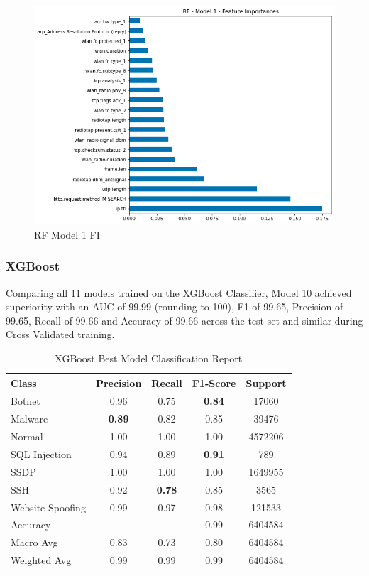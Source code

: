 \begin{figure}[H]
    \centering
	\includegraphics[width=\textwidth]{Appendices/Images/RF/Model1/RF_Model1_FI.png}
	\caption{RF Model 1 FI}
  	\label{fig:rf_model1_fi}
\end{figure}


\subsubsection*{XGBoost}

Comparing all 11 models trained on the XGBoost Classifier, Model 10 achieved superiority with an AUC of 99.99 (rounding to 100), F1 of 99.65, Precision of 99.65, Recall of 99.66 and Accuracy of 99.66 across the test set and similar during Cross Validated training.  


\begin{table}[htbp]
  \centering
  \caption{XGBoost Best Model Classification Report}
  \label{tab:xgb_class_report}
    \begin{tabular}{lcccc}
    \toprule
    Class & Precision & Recall & F1-Score & Support \\
    \midrule
    Botnet & 0.96 & 0.75 & {\color{red}\bfseries 0.84} & 17060 \\
    Malware & {\color{red}\bfseries 0.89} & 0.82 & 0.85 & 39476 \\
    Normal & 1.00 & 1.00 & 1.00 & 4572206 \\
    SQL Injection & 0.94 & 0.89 & {\color{red}\bfseries 0.91} & 789 \\
    SSDP & 1.00 & 1.00 & 1.00 & 1649955 \\
    SSH & 0.92 & {\color{red}\bfseries 0.78} & 0.85 & 3565 \\
    Website Spoofing & 0.99 & 0.97 & 0.98 & 121533 \\
    \midrule
    Accuracy & & & 0.99 & 6404584 \\
    Macro Avg & 0.83 & 0.73 & 0.80 & 6404584 \\
    Weighted Avg & 0.99 & 0.99 & 0.99 & 6404584 \\
    \bottomrule
    \end{tabular}
\end{table}

